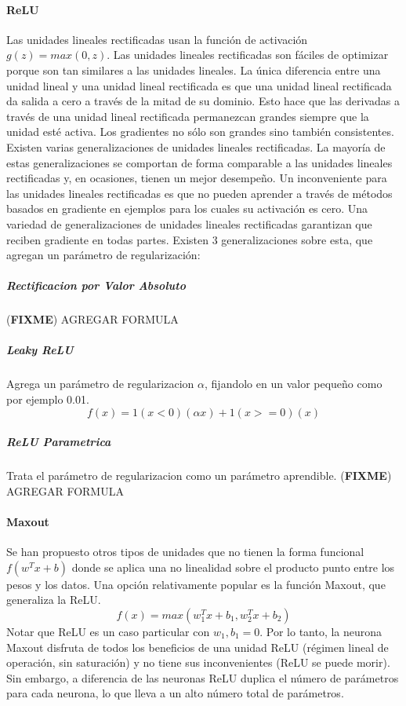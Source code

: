 \documentclass[a4paper,11pt,spanish]{book}
\newcommand*{\FIXME}[1]{{(\textbf{FIXME}) {#1}}}
\begin{document}
	\paragraph{ReLU} Las unidades lineales rectificadas usan la función de activación $g(z) = max(0,z)$. 
	Las unidades lineales rectificadas son fáciles de optimizar porque son tan similares a las unidades lineales. 
	La única diferencia entre una unidad lineal y una unidad lineal rectificada es que una unidad lineal rectificada da salida a cero a través de la mitad de su dominio. 
	Esto hace que las derivadas a través de una unidad lineal rectificada permanezcan grandes siempre que la unidad esté activa.
	Los gradientes no sólo son grandes sino también consistentes.
	Existen varias generalizaciones de unidades lineales rectificadas. La mayoría de estas generalizaciones se comportan de forma comparable a las unidades lineales rectificadas
	y, en ocasiones, tienen un mejor desempeño. Un inconveniente para las unidades lineales rectificadas es que no pueden aprender a través de métodos basados ​​en 
	gradiente en ejemplos para los cuales su activación es cero. Una variedad de generalizaciones de unidades lineales rectificadas garantizan que reciben gradiente en 
	todas partes. Existen 3 generalizaciones sobre esta, que agregan un parámetro de regularización:
	  \subparagraph{Rectificacion por Valor Absoluto} \FIXME{AGREGAR FORMULA}
	  \subparagraph{Leaky ReLU} Agrega un parámetro de regularizacion $\alpha$, fijandolo en un valor pequeño como por ejemplo 0.01. 
	    \begin{equation}
	     f(x)=1(x<0)(\alpha x)+1(x>=0)(x) 
	    \end{equation}

	  \subparagraph{ReLU Parametrica} Trata el parámetro de regularizacion como un parámetro aprendible. \FIXME{AGREGAR FORMULA}
	\paragraph{Maxout} 
	  Se han propuesto otros tipos de unidades que no tienen la forma funcional $f(w^T x + b)$ donde se aplica una no linealidad sobre el producto punto entre los pesos y los datos. 
	  Una opción relativamente popular es la función Maxout, que generaliza la ReLU.
	  \begin{equation}
	   f(x) = max(w_1^T x+b_1,w_2^T x+b_2)
	  \end{equation}
	  Notar que ReLU es un caso particular con $w_1, b_1 = 0$. Por lo tanto, la neurona Maxout disfruta de todos los beneficios de una unidad ReLU (régimen lineal de operación, sin saturación) 
	  y no tiene sus inconvenientes (ReLU se puede morir). Sin embargo, a diferencia de las neuronas ReLU duplica el número de parámetros para cada neurona, 
	  lo que lleva a un alto número total de parámetros. 
      
\end{document}
